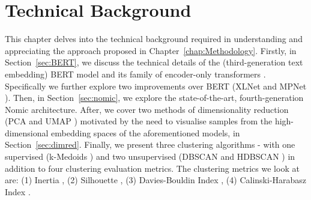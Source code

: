 \documentclass[10pt,oneside]{report}
\begin{document}

\chapter{Technical Background}
This chapter delves into the technical background required in understanding and appreciating the approach proposed in Chapter~\ref{chap:Methodology}. Firstly, in Section~\ref{sec:BERT}, we discuss the technical details of the (third-generation text embedding) BERT model and its family of encoder-only transformers \cite{devlin2019bert}. Specifically we further explore two improvements over BERT (XLNet \cite{yang2019xlnet} and MPNet \cite{song2020mpnet}). Then, in Section~\ref{sec:nomic}, we explore the state-of-the-art, fourth-generation Nomic \cite{nussbaum2024nomic} architecture. After, we cover two methods of dimensionality reduction (PCA \cite{pearson1901liii,hotelling1933analysis} and UMAP \cite{mcinnes2018umap}) motivated by the need to visualise samples from the high-dimensional embedding spaces of the aforementioned models, in Section~\ref{sec:dimred}. Finally, we present three clustering algorithms - with one supervised (k-Medoids \cite{}) and two unsupervised (DBSCAN \cite{ester1996density} and HDBSCAN \cite{campello2013density}) in addition to four clustering evaluation metrics. The clustering metrics we look at are: (1) Inertia \cite{}, (2) Silhouette \cite{rousseeuw1987silhouettes}, (3) Davies-Bouldin Index \cite{davies1979cluster}, (4) Calinski-Harabasz Index \cite{calinski1974dendrite}.  \\ 
\end{document}
